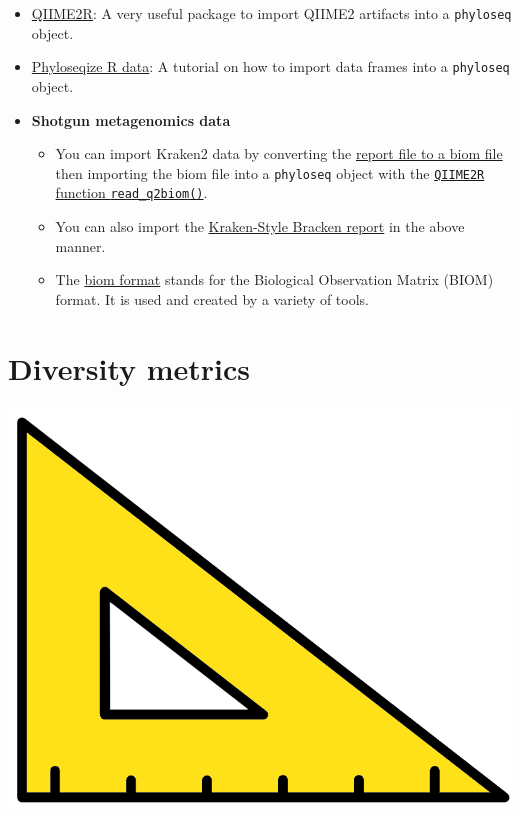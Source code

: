\documentclass[
]{book}
\providecommand{\tightlist}{%
  \setlength{\itemsep}{0pt}\setlength{\parskip}{0pt}}
\begin{document}
\begin{itemize}
\tightlist
\item
  \href{https://github.com/jbisanz/qiime2R}{QIIME2R}: A very useful package to import QIIME2 artifacts into a \texttt{phyloseq} object.
\item
  \href{https://joey711.github.io/phyloseq/import-data.html}{Phyloseqize R data}: A tutorial on how to import data frames into a \texttt{phyloseq} object.
\item
  \textbf{Shotgun metagenomics data}

  \begin{itemize}
  \tightlist
  \item
    You can import Kraken2 data by converting the \href{https://github.com/smdabdoub/kraken-biom}{report file to a biom file} then importing the biom file into a \texttt{phyloseq} object with the \href{https://github.com/jbisanz/qiime2R}{\texttt{QIIME2R} function \texttt{read\_q2biom()}}.
  \item
    You can also import the \href{https://github.com/jenniferlu717/Bracken\#output-kraken-style-bracken-report}{Kraken-Style Bracken report} in the above manner.
  \item
    The \href{https://biom-format.org/}{biom format} stands for the Biological Observation Matrix (BIOM) format. It is used and created by a variety of tools.
  \end{itemize}
\end{itemize}

\hypertarget{diversity-metrics}{%
\chapter{Diversity metrics}\label{diversity-metrics}}

\includegraphics{figures/metric_square.png}
\end{document}
